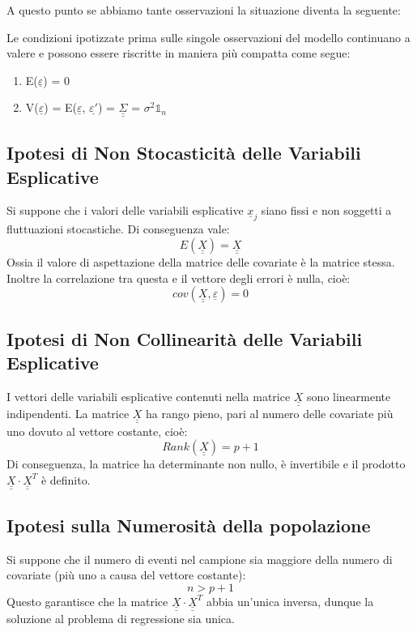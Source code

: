 \documentclass[]{article}
\def\doubleunderline#1{\underline{\underline{#1}}}
\begin{document}
A questo punto se abbiamo tante osservazioni la situazione diventa la seguente:

Le condizioni ipotizzate prima sulle singole osservazioni del modello continuano a valere e possono essere riscritte in maniera più compatta come segue:
\begin{enumerate}
\item E($\underline{\varepsilon}$) = 0
\item V($\underline{\varepsilon}$) = E($\underline{\varepsilon}$, $\underline{\varepsilon'}$) = $\doubleunderline{\Sigma}$ = $\sigma^2 \mathds{1}_n$ 
\end{enumerate}


\subsection{Ipotesi di Non Stocasticità delle Variabili Esplicative}
Si suppone che i valori delle variabili esplicative $\underline{x}_j$ siano fissi e non soggetti a fluttuazioni stocastiche. Di conseguenza vale:
\begin{equation}
 E(\doubleunderline{X}) = \doubleunderline{X}
\end{equation}
Ossia il valore di aspettazione della matrice delle covariate è la matrice stessa. Inoltre la correlazione tra questa e il vettore degli errori è nulla, cioè:
\begin{equation}
 cov(\doubleunderline{X},\underline{\varepsilon}) = 0
\end{equation}

\subsection{Ipotesi di Non Collinearità delle Variabili Esplicative}
I vettori delle variabili esplicative contenuti nella matrice $\doubleunderline{X}$ sono linearmente indipendenti. La matrice $\doubleunderline{X}$ ha rango pieno, pari al numero delle covariate più uno dovuto al vettore costante, cioè:
\begin{equation}
 Rank(\doubleunderline{X}) = p + 1
\end{equation}
Di conseguenza, la matrice ha determinante non nullo, è invertibile e il prodotto $\doubleunderline{X}\cdot\doubleunderline{X}^T$ è definito.

\subsection{Ipotesi sulla Numerosità della popolazione}
Si suppone che il numero di eventi nel campione sia maggiore della numero di covariate (più uno a causa del vettore costante):
\begin{equation}
 n > p + 1
\end{equation}
Questo garantisce che la matrice $\doubleunderline{X} \cdot \doubleunderline{X}^T$ abbia un'unica inversa, dunque la soluzione al problema di regressione sia unica.
\end{document}
